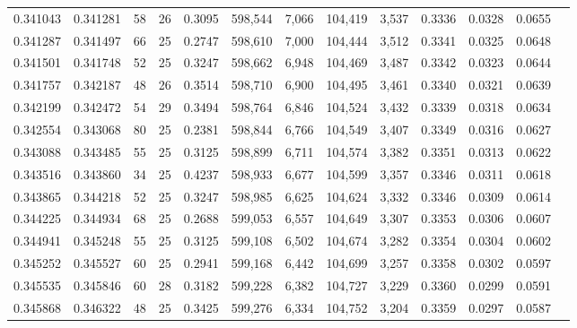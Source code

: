 \begin{tabular}{rrrrrrrrrrrrr}
0.341043 & 0.341281 &  58 &  26 &                                     0.3095 & 598,544 &   7,066 & 104,419 &   3,537 & 0.3336 & 0.0328 & 0.0655 \\
0.341287 & 0.341497 &  66 &  25 &                                     0.2747 & 598,610 &   7,000 & 104,444 &   3,512 & 0.3341 & 0.0325 & 0.0648 \\
0.341501 & 0.341748 &  52 &  25 &                                     0.3247 & 598,662 &   6,948 & 104,469 &   3,487 & 0.3342 & 0.0323 & 0.0644 \\
0.341757 & 0.342187 &  48 &  26 &                                     0.3514 & 598,710 &   6,900 & 104,495 &   3,461 & 0.3340 & 0.0321 & 0.0639 \\
0.342199 & 0.342472 &  54 &  29 &                                     0.3494 & 598,764 &   6,846 & 104,524 &   3,432 & 0.3339 & 0.0318 & 0.0634 \\
0.342554 & 0.343068 &  80 &  25 &                                     0.2381 & 598,844 &   6,766 & 104,549 &   3,407 & 0.3349 & 0.0316 & 0.0627 \\
0.343088 & 0.343485 &  55 &  25 &                                     0.3125 & 598,899 &   6,711 & 104,574 &   3,382 & 0.3351 & 0.0313 & 0.0622 \\
0.343516 & 0.343860 &  34 &  25 &                                     0.4237 & 598,933 &   6,677 & 104,599 &   3,357 & 0.3346 & 0.0311 & 0.0618 \\
0.343865 & 0.344218 &  52 &  25 &                                     0.3247 & 598,985 &   6,625 & 104,624 &   3,332 & 0.3346 & 0.0309 & 0.0614 \\
0.344225 & 0.344934 &  68 &  25 &                                     0.2688 & 599,053 &   6,557 & 104,649 &   3,307 & 0.3353 & 0.0306 & 0.0607 \\
0.344941 & 0.345248 &  55 &  25 &                                     0.3125 & 599,108 &   6,502 & 104,674 &   3,282 & 0.3354 & 0.0304 & 0.0602 \\
0.345252 & 0.345527 &  60 &  25 &                                     0.2941 & 599,168 &   6,442 & 104,699 &   3,257 & 0.3358 & 0.0302 & 0.0597 \\
0.345535 & 0.345846 &  60 &  28 &                                     0.3182 & 599,228 &   6,382 & 104,727 &   3,229 & 0.3360 & 0.0299 & 0.0591 \\
0.345868 & 0.346322 &  48 &  25 &                                     0.3425 & 599,276 &   6,334 & 104,752 &   3,204 & 0.3359 & 0.0297 & 0.0587 \\

\end{tabular}
